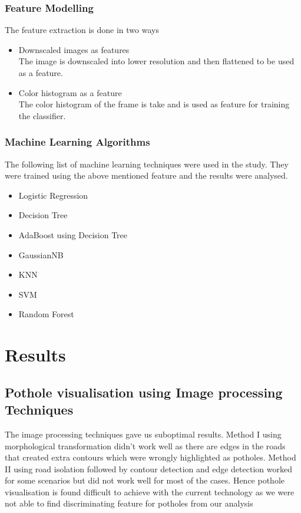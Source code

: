 \documentclass[journal]{IEEEtran}
\begin{document}
\subsubsection{Feature Modelling}

The feature extraction is done in two ways 
\begin{itemize}
\item Downscaled images as features \\
The image is downscaled into lower resolution and then flattened to be used as a feature.
\item Color histogram as a feature \\
The color histogram of the frame is take and is used as feature for training the classifier.
\end{itemize}


\subsubsection{Machine Learning Algorithms}

The following list of machine learning techniques were used in the study. They were trained using the above mentioned feature and the results were analysed.

\begin{itemize}
\item Logistic Regression \cite{lr}
\item Decision Tree \cite{dt}
\item AdaBoost using Decision Tree
\item GaussianNB
\item KNN \cite{knn}
\item SVM \cite{svm}
\item Random Forest \cite{rf}
\end{itemize}

\section{Results}


\subsection{Pothole visualisation using Image processing Techniques}

The image processing techniques gave us suboptimal results. Method I using morphological transformation didn't work well as there are edges in the roads that created extra contours which were wrongly highlighted as potholes. Method II using road isolation followed by contour detection and edge detection worked for some scenarios but did not work well for most of the cases. Hence pothole visualisation is found difficult to achieve with the current technology as we were not able to find discriminating feature for potholes from our analysis
\end{document}

